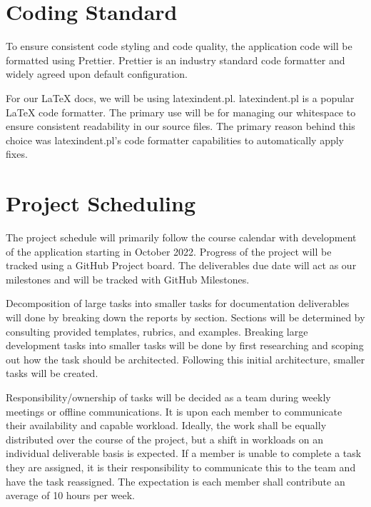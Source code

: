 \documentclass{article}
\begin{document}
\section{Coding Standard}

To ensure consistent code styling and code quality, the application code will be formatted using
Prettier. Prettier is an industry standard code formatter and widely agreed upon default
configuration.

For our \LaTeX{} docs, we will be using latexindent.pl. latexindent.pl is a popular \LaTeX{} code
formatter. The primary use will be for managing our whitespace to ensure consistent readability in
our source files. The primary reason behind this choice was latexindent.pl's code formatter
capabilities to automatically apply fixes.

\section{Project Scheduling}


The project schedule will primarily follow the course calendar with development of the application
starting in October 2022. Progress of the project will be tracked using a GitHub Project board. The
deliverables due date will act as our milestones and will be tracked with GitHub Milestones.

Decomposition of large tasks into smaller tasks for documentation deliverables will done by breaking
down the reports by section. Sections will be determined by consulting provided templates, rubrics,
and examples. Breaking large development tasks into smaller tasks will be done by first researching
and scoping out how the task should be architected. Following this initial architecture, smaller
tasks will be created.

Responsibility/ownership of tasks will be decided as a team during weekly meetings or offline
communications. It is upon each member to communicate their availability and capable workload.
Ideally, the work shall be equally distributed over the course of the project, but a shift in
workloads on an individual deliverable basis is expected. If a member is unable to complete a task
they are assigned, it is their responsibility to communicate this to the team and have the task
reassigned. The expectation is each member shall contribute an average of 10 hours per week.
\end{document}
